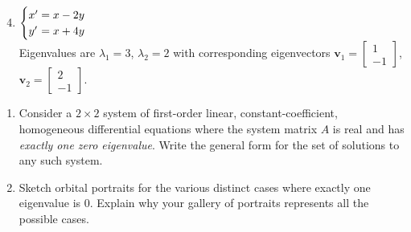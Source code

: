 \documentclass[12pt,letterpaper]{hmcpset}
\newcommand{\m}[1]{\begin{bmatrix} #1 \end{bmatrix}}
\begin{document}
\begin{problem}[1 cont.]
    \begin{enumerate}
        \setcounter{enumi}{3}
        \item $\begin{cases}
            x'&\hspace{-.1in}=x-2y\\
            y'&\hspace{-.1in}=x+4y\end{cases}$\\
            Eigenvalues are $\lambda_1=3$, $\lambda_2=2$ with
            corresponding eigenvectors $\mathbf{v}_1=\m{1\\-1}$,
            $\mathbf{v}_2=\m{2\\-1}$.
    \end{enumerate}
\end{problem}
\begin{solution}
    \vfill
\end{solution}
\newpage

\begin{problem}[2]
    \begin{enumerate}
        \item Consider a $2\times2$ system of first-order linear,
            constant-coefficient, homogeneous differential equations
            where the system matrix $A$ is real and has \textit{exactly
            one zero eigenvalue}. Write the general form for the set
            of solutions to any such system.
        \item Sketch orbital portraits for the various distinct cases
            where exactly one eigenvalue is $0$. Explain why your
            gallery of portraits represents all the possible cases.
\end{enumerate}
\end{problem}
\begin{solution}
    \vfill
\end{solution}
\newpage
\end{document}
